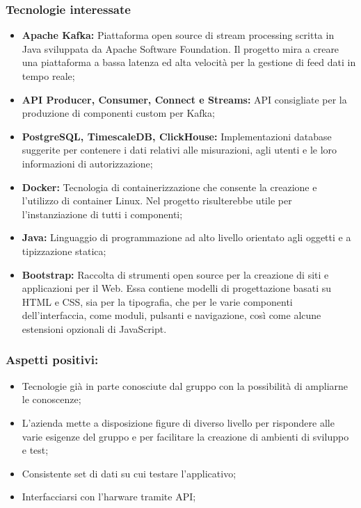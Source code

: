 	\subsubsection{Tecnologie interessate}
		\begin{itemize}
			\item \textbf{Apache Kafka:} Piattaforma open source di stream processing scritta in Java sviluppata da Apache Software Foundation. Il progetto mira a creare una piattaforma a bassa latenza ed alta velocità per la gestione di feed dati in tempo reale;
			\item \textbf{API Producer, Consumer, Connect e Streams:} API consigliate per la produzione di componenti custom per Kafka;
			\item \textbf{PostgreSQL, TimescaleDB, ClickHouse:} Implementazioni database suggerite per contenere i dati relativi alle misurazioni, agli utenti e le loro informazioni di autorizzazione;
			\item \textbf{Docker:} Tecnologia di containerizzazione che consente la creazione e l'utilizzo di container Linux. Nel progetto risulterebbe utile per l'instanziazione di tutti i componenti;   
			\item \textbf{Java:} Linguaggio di programmazione ad alto livello orientato agli oggetti e a tipizzazione statica;
			\item \textbf{Bootstrap:} Raccolta di strumenti open source per la creazione di siti e applicazioni per il Web. Essa contiene modelli di progettazione basati su HTML e CSS, sia per la tipografia, che per le varie componenti dell'interfaccia, come moduli, pulsanti e navigazione, così come alcune estensioni opzionali di JavaScript.
		\end{itemize}

	\subsubsection{Aspetti positivi:}
		\begin{itemize}
			\item Tecnologie già in parte conosciute dal gruppo con la possibilità di ampliarne le conoscenze;
			\item L'azienda mette a disposizione figure di diverso livello per rispondere alle varie esigenze del gruppo e per facilitare la creazione di ambienti di sviluppo e test;
			\item Consistente set di dati su cui testare l'applicativo;
			\item Interfacciarsi con l'harware tramite API;
		\end{itemize}
	
